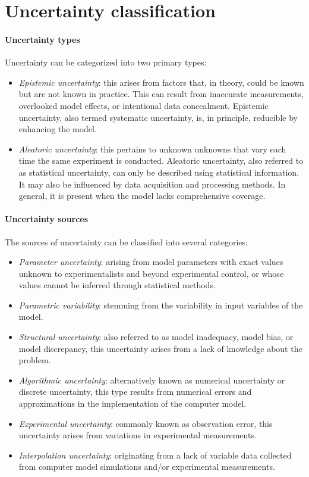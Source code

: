 \section{Uncertainty classification}

\paragraph*{Uncertainty types}
Uncertainty can be categorized into two primary types:
\begin{itemize}
    \item \textit{Epistemic uncertainty}: this arises from factors that, in theory, could be known but are not known in practice. 
        This can result from inaccurate measurements, overlooked model effects, or intentional data concealment. 
        Epistemic uncertainty, also termed systematic uncertainty, is, in principle, reducible by enhancing the model.   
    \item \textit{Aleatoric uncertainty}: this pertains to unknown unknowns that vary each time the same experiment is conducted. 
        Aleatoric uncertainty, also referred to as statistical uncertainty, can only be described using statistical information. 
        It may also be influenced by data acquisition and processing methods. 
        In general, it is present when the model lacks comprehensive coverage.
\end{itemize}

\paragraph*{Uncertainty sources}
The sources of uncertainty can be classified into several categories:
\begin{itemize}
    \item \textit{Parameter uncertainty}: arising from model parameters with exact values unknown to experimentalists and beyond experimental control, or whose values cannot be inferred through statistical methods.
    \item \textit{Parametric variability}: stemming from the variability in input variables of the model. 
    \item \textit{Structural uncertainty}: also referred to as model inadequacy, model bias, or model discrepancy, this uncertainty arises from a lack of knowledge about the problem.
    \item \textit{Algorithmic uncertainty}: alternatively known as numerical uncertainty or discrete uncertainty, this type results from numerical errors and approximations in the implementation of the computer model.
    \item \textit{Experimental uncertainty}: commonly known as observation error, this uncertainty arises from variations in experimental measurements.
    \item \textit{Interpolation uncertainty}: originating from a lack of variable data collected from computer model simulations and/or experimental measurements.
\end{itemize}